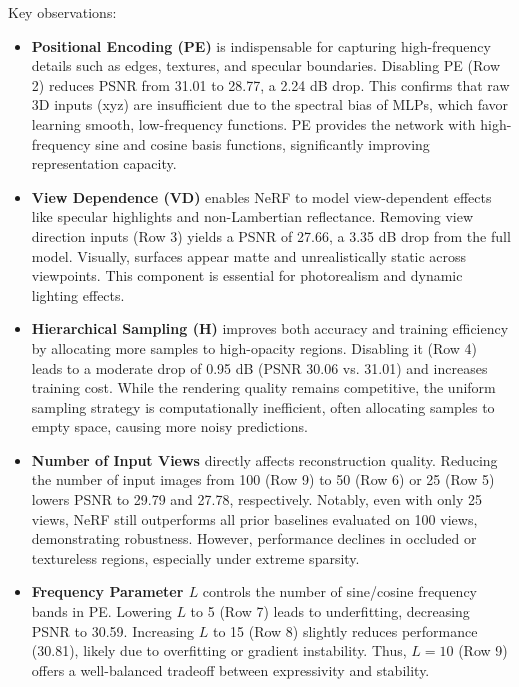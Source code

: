 Key observations:

\begin{itemize}
    \item \textbf{Positional Encoding (PE)} is indispensable for capturing high-frequency details such as edges, textures, and specular boundaries. Disabling PE (Row 2) reduces PSNR from 31.01 to 28.77, a 2.24 dB drop. This confirms that raw 3D inputs (xyz) are insufficient due to the spectral bias of MLPs, which favor learning smooth, low-frequency functions. PE provides the network with high-frequency sine and cosine basis functions, significantly improving representation capacity.
    
    \item \textbf{View Dependence (VD)} enables NeRF to model view-dependent effects like specular highlights and non-Lambertian reflectance. Removing view direction inputs (Row 3) yields a PSNR of 27.66, a 3.35 dB drop from the full model. Visually, surfaces appear matte and unrealistically static across viewpoints. This component is essential for photorealism and dynamic lighting effects.
    
    \item \textbf{Hierarchical Sampling (H)} improves both accuracy and training efficiency by allocating more samples to high-opacity regions. Disabling it (Row 4) leads to a moderate drop of 0.95 dB (PSNR 30.06 vs. 31.01) and increases training cost. While the rendering quality remains competitive, the uniform sampling strategy is computationally inefficient, often allocating samples to empty space, causing more noisy predictions.
    
    \item \textbf{Number of Input Views} directly affects reconstruction quality. Reducing the number of input images from 100 (Row 9) to 50 (Row 6) or 25 (Row 5) lowers PSNR to 29.79 and 27.78, respectively. Notably, even with only 25 views, NeRF still outperforms all prior baselines evaluated on 100 views, demonstrating robustness. However, performance declines in occluded or textureless regions, especially under extreme sparsity.
    
    \item \textbf{Frequency Parameter \( L \)} controls the number of sine/cosine frequency bands in PE. Lowering \( L \) to 5 (Row 7) leads to underfitting, decreasing PSNR to 30.59. Increasing \( L \) to 15 (Row 8) slightly reduces performance (30.81), likely due to overfitting or gradient instability. Thus, \( L = 10 \) (Row 9) offers a well-balanced tradeoff between expressivity and stability.
\end{itemize}

